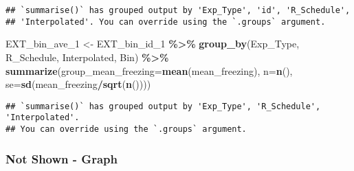 \documentclass[
]{article}
\newenvironment{Shaded}{\begin{snugshade}}{\end{snugshade}}
\newcommand{\AttributeTok}[1]{\textcolor[rgb]{0.13,0.29,0.53}{#1}}
\newcommand{\FunctionTok}[1]{\textcolor[rgb]{0.13,0.29,0.53}{\textbf{#1}}}
\newcommand{\NormalTok}[1]{#1}
\newcommand{\OtherTok}[1]{\textcolor[rgb]{0.56,0.35,0.01}{#1}}
\newcommand{\SpecialCharTok}[1]{\textcolor[rgb]{0.81,0.36,0.00}{\textbf{#1}}}
\newcommand{\StringTok}[1]{\textcolor[rgb]{0.31,0.60,0.02}{#1}}
\begin{document}
\begin{verbatim}
## `summarise()` has grouped output by 'Exp_Type', 'id', 'R_Schedule',
## 'Interpolated'. You can override using the `.groups` argument.
\end{verbatim}

\begin{Shaded}
\begin{Highlighting}[]
\NormalTok{EXT\_bin\_ave\_1 }\OtherTok{\textless{}{-}}\NormalTok{ EXT\_bin\_id\_1 }\SpecialCharTok{\%\textgreater{}\%} 
  \FunctionTok{group\_by}\NormalTok{(Exp\_Type, R\_Schedule, Interpolated, Bin) }\SpecialCharTok{\%\textgreater{}\%}
  \FunctionTok{summarize}\NormalTok{(}\AttributeTok{group\_mean\_freezing=}\FunctionTok{mean}\NormalTok{(mean\_freezing), }\AttributeTok{n=}\FunctionTok{n}\NormalTok{(),}
            \AttributeTok{se=}\FunctionTok{sd}\NormalTok{(mean\_freezing}\SpecialCharTok{/}\FunctionTok{sqrt}\NormalTok{(}\FunctionTok{n}\NormalTok{())))}
\end{Highlighting}
\end{Shaded}

\begin{verbatim}
## `summarise()` has grouped output by 'Exp_Type', 'R_Schedule', 'Interpolated'.
## You can override using the `.groups` argument.
\end{verbatim}

\begin{Shaded}
\end{Shaded}

\hypertarget{not-shown---graph}{%
\subsubsection{Not Shown - Graph}\label{not-shown---graph}}
\end{document}
